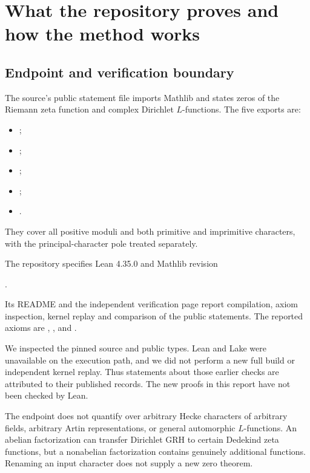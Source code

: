 \section{What the repository proves and how the method works}

\subsection{Endpoint and verification boundary}

The source's public statement file imports Mathlib and states zeros of the Riemann zeta function and complex Dirichlet $L$-functions. The five exports are:
\begin{itemize}
\item {};
\item {};
\item {};
\item {};
\item {}.
\end{itemize}
They cover all positive moduli and both primitive and imprimitive characters, with the principal-character pole treated separately.\cite{repo,repo_readme}

The repository specifies Lean 4.35.0 and Mathlib revision
\begin{center}.\end{center}
Its README and the independent verification page report compilation, axiom inspection, kernel replay and comparison of the public statements. The reported axioms are , , and .\cite{repo_readme,verification}

We inspected the pinned source and public types. Lean and Lake were unavailable on the execution path, and we did not perform a new full build or independent kernel replay. Thus statements about those earlier checks are attributed to their published records. The new proofs in this report have not been checked by Lean.

The endpoint does not quantify over arbitrary Hecke characters of arbitrary fields, arbitrary Artin representations, or general automorphic $L$-functions. An abelian factorization can transfer Dirichlet GRH to certain Dedekind zeta functions, but a nonabelian factorization contains genuinely additional functions. Renaming an input character does not supply a new zero theorem.


